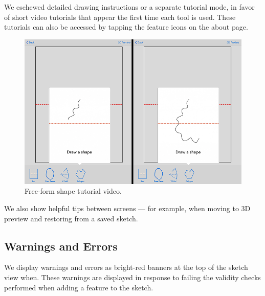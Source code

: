 We eschewed detailed drawing instructions or a separate tutorial mode,
in favor of short video tutorials that appear the first time each tool
is used. These tutorials can also be accessed by tapping the feature
icons on the about page.

\begin{figure}[htbp]
\centering
\includegraphics{figures/32_UI_Tool_Interactions/tutorial_step_one_two.png}
\caption{Free-form shape tutorial video.}
\end{figure}

We also show helpful tips between screens --- for example, when moving
to 3D preview and restoring from a saved sketch.

\subsection{Warnings and Errors}\label{warnings-and-errors}

We display warnings and errors as bright-red banners at the top of the
sketch view when. These warnings are displayed in response to failing
the validity checks performed when adding a feature to the sketch.

